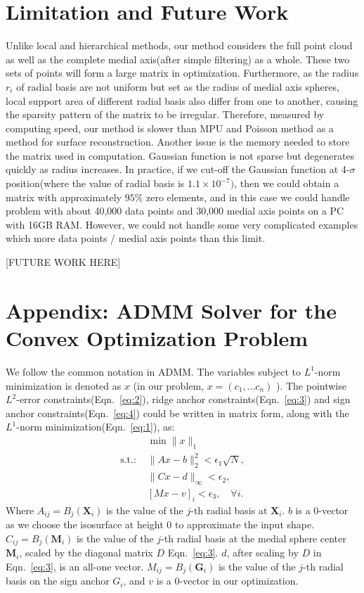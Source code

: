 \documentclass[review]{acmsiggraph}
\begin{document}
\section{Limitation and Future Work}
Unlike local and hierarchical methods, our method considers the full point cloud as well as the complete medial axis(after simple filtering) as a whole. These two sets of points will form a large matrix in optimization. Furthermore, as the radius $r_i$ of radial basis are not uniform but set as the radius of medial axis spheres, local support area of different radial basis also differ from one to another, causing the sparsity pattern of the matrix to be irregular. Therefore, measured by computing speed, our method is slower than MPU and Poisson method as a method for surface reconstruction. Another issue is the memory needed to store the matrix used in computation. Gaussian function is not sparse but degenerates quickly as radius increases. In practice, if we cut-off the Gaussian function at 4-$\sigma$ position(where the value of radial basis is $1.1\times 10^{-7})$, then we could obtain a matrix with approximately $95\%$ zero elements, and in this case we could handle problem with about 40,000 data points and 30,000 medial axis points on a PC with 16GB RAM. However, we could not handle some very complicated examples which more data points / medial axis points than this limit. 

[FUTURE WORK HERE]


\section*{Appendix: ADMM Solver for the Convex Optimization Problem}
We follow the common notation in ADMM. The variables subject to $L^1$-norm minimization is denoted as $x$ (in our problem, $x=(c_1,...c_n)$ ). The pointwise $L^2$-error constraints(Eqn.~\ref{eq:2}), ridge anchor constraints(Eqn.~\ref{eq:3}) and sign anchor constraints(Eqn.~\ref{eq:4}) could be written in matrix form, along with the $L^1$-norm minimization(Eqn.~\ref{eq:1}), as:
\begin{align}
&\min\|x\|_1\\
\mbox{s.t.: }&\|Ax-b\|_2^2<\epsilon_1\sqrt{N},\\
&\|Cx-d\|_{\infty}<\epsilon_2,\\
&[Mx-v]_i<\epsilon_3,\quad\forall i.
\end{align}
Where $A_{ij}=B_j(\mathbf{X}_i)$ is the value of the $j$-th radial basis at $\mathbf{X}_i$. $b$ is a 0-vector as we choose the isosurface at height 0 to approximate the input shape. $C_{ij}=B_j(\mathbf{M}_i)$ is the value of the $j$-th radial basis at the medial sphere center $\mathbf{M}_i$, scaled by the diagonal matrix $D$ Eqn.~\ref{eq:3}. $d$, after scaling by $D$ in Eqn.~\ref{eq:3}, is an all-one vector. $M_{ij}=B_j(\mathbf{G}_i)$ is the value of the $j$-th radial basis on the sign anchor $G_i$, and $v$ is a 0-vector in our optimization.
\end{document}
